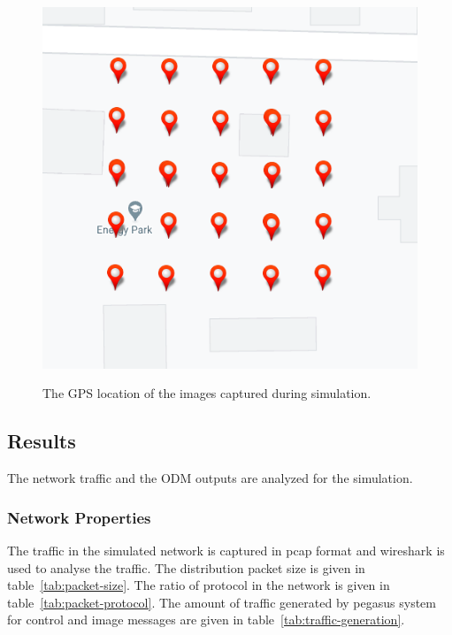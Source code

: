 \begin{figure}
	\centering
	\caption[The GPS location of the images captured during simulation.]{\small The GPS location of the images captured during simulation.} 
	\includegraphics[width=5in]{figures/experiment/simulated-image-position}
	\label{fig:simulated-images-position}
\end{figure}

\subsection{Results}
The network traffic and the ODM outputs are analyzed for the simulation.

\subsubsection{Network Properties}
The traffic in the simulated network is captured in pcap format and wireshark is used to analyse the traffic. The distribution packet size is given in table~\ref{tab:packet-size}. The ratio of protocol in the network is given in table~\ref{tab:packet-protocol}. The amount of traffic generated by pegasus system for control and image messages are given in table~\ref{tab:traffic-generation}.


